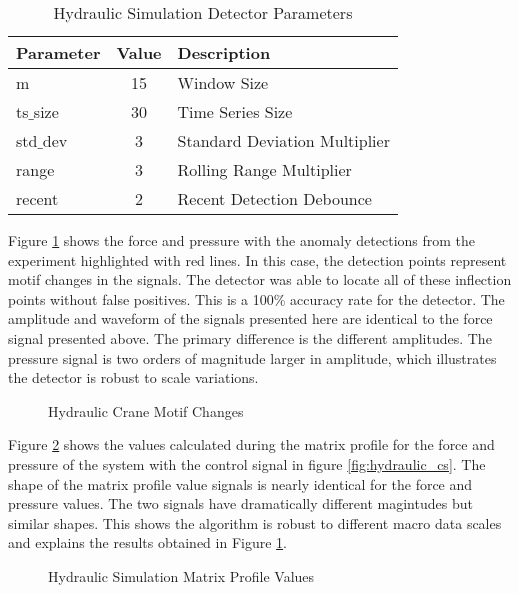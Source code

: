 \begin{table}[H]
\caption{Hydraulic Simulation Detector Parameters}
\begin{tabular}{|l|c|l|}
    \hline
	\textbf{Parameter} & \textbf{Value} & \textbf{Description} \\ \hline
	m & 15 & Window Size \\ \hline
	ts$\_$size & 30 & Time Series Size \\ \hline
	std$\_$dev & 3 & Standard Deviation Multiplier \\ \hline
	range & 3 & Rolling Range Multiplier\\ \hline
	recent & 2 & Recent Detection Debounce\\ \hline
\end{tabular}
\label{tab:hydraulic_sim_params}
\end{table}

Figure \ref{fig:hydraulic_result_fp} shows the force and pressure with the anomaly detections from the experiment highlighted with red lines. In this case, the detection points represent motif changes in the signals. The detector was able to locate all of these inflection points without false positives. This is a 100\% accuracy rate for the detector. The amplitude and waveform of the signals presented here are identical to the force signal presented above. The primary difference is the different amplitudes. The pressure signal is two orders of magnitude larger in amplitude, which illustrates the detector is robust to scale variations.

\begin{figure}[H]
    
    \caption{Hydraulic Crane Motif Changes}
    \label{fig:hydraulic_result_fp}
\end{figure}

Figure \ref{fig:hydraulic_mp_hist_fp} shows the values calculated during the matrix profile for the force and pressure of the system with the control signal in figure \ref{fig:hydraulic_cs}. The shape of the matrix profile value signals is nearly identical for the force and pressure values. The two signals have dramatically different magintudes but similar shapes. This shows the algorithm is robust to different macro data scales and explains the results obtained in Figure \ref{fig:hydraulic_result_fp}.
\begin{figure}[H]
    
    \caption{Hydraulic Simulation Matrix Profile Values}
    \label{fig:hydraulic_mp_hist_fp}
\end{figure}


